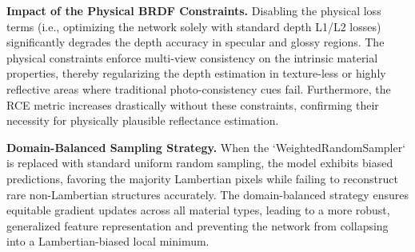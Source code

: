 \textbf{Impact of the Physical BRDF Constraints.} 
Disabling the physical loss terms (i.e., optimizing the network solely with standard depth L1/L2 losses) significantly degrades the depth accuracy in specular and glossy regions. The physical constraints enforce multi-view consistency on the intrinsic material properties, thereby regularizing the depth estimation in texture-less or highly reflective areas where traditional photo-consistency cues fail. Furthermore, the RCE metric increases drastically without these constraints, confirming their necessity for physically plausible reflectance estimation.

\textbf{Domain-Balanced Sampling Strategy.} 
When the `WeightedRandomSampler` is replaced with standard uniform random sampling, the model exhibits biased predictions, favoring the majority Lambertian pixels while failing to reconstruct rare non-Lambertian structures accurately. The domain-balanced strategy ensures equitable gradient updates across all material types, leading to a more robust, generalized feature representation and preventing the network from collapsing into a Lambertian-biased local minimum.